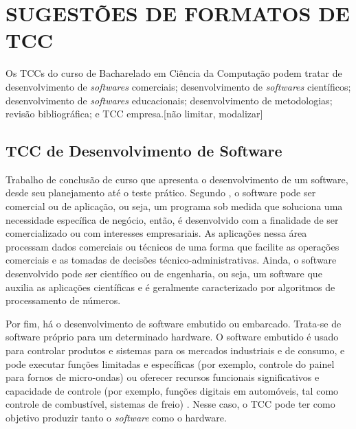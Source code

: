 \section{SUGESTÕES DE FORMATOS DE TCC}\label{sec:SUGESTOESTCC}
Os TCCs do curso de Bacharelado em Ciência da Computação podem tratar de desenvolvimento de \textit{softwares} comerciais; desenvolvimento de \textit{softwares} científicos; desenvolvimento de \textit{softwares} educacionais; desenvolvimento de metodologias; revisão bibliográfica; e TCC empresa.[não limitar, modalizar]

\subsection{TCC de Desenvolvimento de Software}\label{sec:DesenvolvimentoSof}

Trabalho de conclusão de curso que apresenta o desenvolvimento de um software, desde seu planejamento até o teste prático. Segundo \textcite{Pressman2011}, o software pode ser comercial ou de aplicação, ou seja, um programa sob medida que soluciona uma necessidade específica de negócio, então, é desenvolvido com a finalidade de ser comercializado ou com interesses empresariais. As aplicações nessa área processam dados comerciais ou técnicos de uma forma que facilite as operações comerciais e as tomadas de decisões técnico-administrativas. Ainda, o software desenvolvido pode ser científico ou de engenharia, ou seja, um software que auxilia as aplicações científicas e é geralmente caracterizado por algoritmos de processamento de números. 

Por fim, há o desenvolvimento de software embutido ou embarcado. Trata-se de software próprio para um determinado hardware. O software embutido é usado para controlar produtos e sistemas para os mercados industriais e de consumo, e pode executar funções limitadas e específicas (por exemplo, controle do painel para fornos de micro-ondas) ou oferecer recursos funcionais significativos e capacidade de controle (por exemplo, funções digitais em automóveis, tal como controle de combustível, sistemas de freio) \cite{Pressman2011}. Nesse caso, o TCC pode ter como objetivo produzir tanto o \textit{software} como o hardware.

